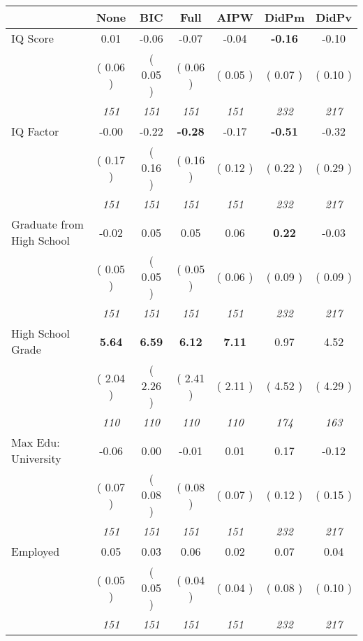 \begin{tabular}{l c c c c c c}
\toprule
 & None & BIC & Full & AIPW & DidPm & DidPv \\
\midrule
IQ Score &      0.01 &     -0.06 &     -0.07 &     -0.04 & \textbf{     -0.16 } &     -0.10 \\
& (     0.06 ) & (     0.05 ) & (     0.06 ) & (     0.05 ) & (     0.07 ) & (     0.10 ) \\
& \textit{ 151 } & \textit{ 151 } & \textit{ 151 } & \textit{ 151 } & \textit{ 232 } & \textit{ 217 } \\
IQ Factor &     -0.00 &     -0.22 & \textbf{     -0.28 } &     -0.17 & \textbf{     -0.51 } &     -0.32 \\
& (     0.17 ) & (     0.16 ) & (     0.16 ) & (     0.12 ) & (     0.22 ) & (     0.29 ) \\
& \textit{ 151 } & \textit{ 151 } & \textit{ 151 } & \textit{ 151 } & \textit{ 232 } & \textit{ 217 } \\
Graduate from High School &     -0.02 &      0.05 &      0.05 &      0.06 & \textbf{      0.22 } &     -0.03 \\
& (     0.05 ) & (     0.05 ) & (     0.05 ) & (     0.06 ) & (     0.09 ) & (     0.09 ) \\
& \textit{ 151 } & \textit{ 151 } & \textit{ 151 } & \textit{ 151 } & \textit{ 232 } & \textit{ 217 } \\
High School Grade & \textbf{      5.64 } & \textbf{      6.59 } & \textbf{      6.12 } & \textbf{     7.11} &      0.97 &      4.52 \\
& (     2.04 ) & (     2.26 ) & (     2.41 ) & (     2.11 ) & (     4.52 ) & (     4.29 ) \\
& \textit{ 110 } & \textit{ 110 } & \textit{ 110 } & \textit{ 110 } & \textit{ 174 } & \textit{ 163 } \\
Max Edu: University &     -0.06 &      0.00 &     -0.01 &      0.01 &      0.17 &     -0.12 \\
& (     0.07 ) & (     0.08 ) & (     0.08 ) & (     0.07 ) & (     0.12 ) & (     0.15 ) \\
& \textit{ 151 } & \textit{ 151 } & \textit{ 151 } & \textit{ 151 } & \textit{ 232 } & \textit{ 217 } \\
Employed &      0.05 &      0.03 &      0.06 &      0.02 &      0.07 &      0.04 \\
& (     0.05 ) & (     0.05 ) & (     0.04 ) & (     0.04 ) & (     0.08 ) & (     0.10 ) \\
& \textit{ 151 } & \textit{ 151 } & \textit{ 151 } & \textit{ 151 } & \textit{ 232 } & \textit{ 217 } \\

\end{tabular}
